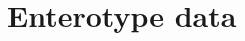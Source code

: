 \documentclass[12pt]{article}
\def \bfity{\mbox{\textbf{\textit{y}}}}
\def \bfitV{\mbox{\textbf{\textit{V}}}}
\def \bfitX{\mbox{\textbf{\textit{X}}}}
\def \X{\mathbf{X}}
\def \V{\mathbf{V}}
\begin{document}
\section{Enterotype data}\label{sec_data}

%
%
%
\end{document}
